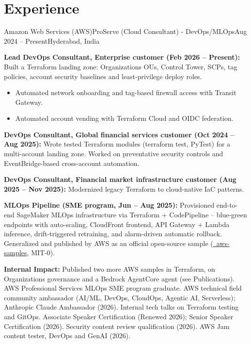 \section{\textbf{Experience}}
\resumeSubHeadingListStart

\resumeExp
{Amazon Web Services (AWS)}{ProServe (Cloud Consultant) - DevOps/MLOps}{Aug 2024 -- Present}{Hyderabad, India}
\resumeItemListStart
    \item[$\diamond$] \textbf{Lead DevOps Consultant, Enterprise customer (Feb 2026 -- Present):} Built a Terraform landing zone: Organizations OUs, Control Tower, SCPs, tag policies, account security baselines and least-privilege deploy roles.
    \begin{itemize}[leftmargin=2.5ex, noitemsep, topsep=0pt, labelsep=1.2mm]
        \item[$\circ$] Automated network onboarding and tag-based firewall access with Transit Gateway.
        \item[$\circ$] Automated account vending with Terraform Cloud and OIDC federation.
    \end{itemize}
    \item[$\diamond$] \textbf{DevOps Consultant, Global financial services customer (Oct 2024 -- Aug 2025):} Wrote tested Terraform modules (terraform test, PyTest) for a multi-account landing zone. Worked on preventative security controls and EventBridge-based cross-account automation.
    \item[$\diamond$] \textbf{DevOps Consultant, Financial market infrastructure customer (Aug 2025 -- Nov 2025):} Modernized legacy Terraform to cloud-native IaC patterns.
    \item[$\diamond$] \textbf{MLOps Pipeline (SME program, Jun -- Aug 2025):} Provisioned end-to-end SageMaker MLOps infrastructure via Terraform + CodePipeline -- blue-green endpoints with auto-scaling, CloudFront frontend, API Gateway + Lambda inference, drift-triggered retraining, and alarm-driven automatic rollback. Generalized and published by AWS as an official open-source sample (\href{https://github.com/aws-samples/sample-sagemaker-image-classification-mlops}{\faGithub\ aws-samples}, MIT-0).
    \item[$\diamond$] \textbf{Internal Impact:} Published two more AWS samples in Terraform, on Organizations governance and a Bedrock AgentCore agent (see Publications). AWS Professional Services MLOps SME program graduate. AWS technical field community ambassador (AI/ML, DevOps, CloudOps, Agentic AI, Serverless); Anthropic Claude Ambassador (2026). Internal tech talks on Terraform testing and GitOps. Associate Speaker Certification (Renewed 2026); Senior Speaker Certification (2026). Security content review qualification (2026). AWS Jam content tester, DevOps and GenAI (2026).
\resumeItemListEnd

